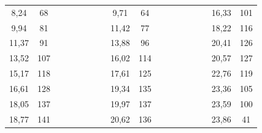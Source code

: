 \begin{enumerate}
\begin{table}[h!]
{\begin{tabular}{|cc|cccccccccccccccc}
					\multicolumn{1}{|c|}{8,24}     & 68                &  &  &  &  &  & \multicolumn{1}{c|}{} & \multicolumn{1}{c|}{9,71}     & \multicolumn{1}{c|}{64}                &  &  &  &  &  & \multicolumn{1}{c|}{} & \multicolumn{1}{c|}{16,33}    & \multicolumn{1}{c|}{101}               \\ \cline{1-2} \cline{9-10} \cline{17-18} 
					\multicolumn{1}{|c|}{9,94}     & 81                &  &  &  &  &  & \multicolumn{1}{c|}{} & \multicolumn{1}{c|}{11,42}    & \multicolumn{1}{c|}{77}                &  &  &  &  &  & \multicolumn{1}{c|}{} & \multicolumn{1}{c|}{18,22}    & \multicolumn{1}{c|}{116}               \\ \cline{1-2} \cline{9-10} \cline{17-18} 
					\multicolumn{1}{|c|}{11,37}    & 91                &  &  &  &  &  & \multicolumn{1}{c|}{} & \multicolumn{1}{c|}{13,88}    & \multicolumn{1}{c|}{96}                &  &  &  &  &  & \multicolumn{1}{c|}{} & \multicolumn{1}{c|}{20,41}    & \multicolumn{1}{c|}{126}               \\ \cline{1-2} \cline{9-10} \cline{17-18} 
					\multicolumn{1}{|c|}{13,52}    & 107               &  &  &  &  &  & \multicolumn{1}{c|}{} & \multicolumn{1}{c|}{16,02}    & \multicolumn{1}{c|}{114}               &  &  &  &  &  & \multicolumn{1}{c|}{} & \multicolumn{1}{c|}{20,57}    & \multicolumn{1}{c|}{127}               \\ \cline{1-2} \cline{9-10} \cline{17-18} 
					\multicolumn{1}{|c|}{15,17}    & 118               &  &  &  &  &  & \multicolumn{1}{c|}{} & \multicolumn{1}{c|}{17,61}    & \multicolumn{1}{c|}{125}               &  &  &  &  &  & \multicolumn{1}{c|}{} & \multicolumn{1}{c|}{22,76}    & \multicolumn{1}{c|}{119}               \\ \cline{1-2} \cline{9-10} \cline{17-18} 
					\multicolumn{1}{|c|}{16,61}    & 128               &  &  &  &  &  & \multicolumn{1}{c|}{} & \multicolumn{1}{c|}{19,34}    & \multicolumn{1}{c|}{135}               &  &  &  &  &  & \multicolumn{1}{c|}{} & \multicolumn{1}{c|}{23,36}    & \multicolumn{1}{c|}{105}               \\ \cline{1-2} \cline{9-10} \cline{17-18} 
					\multicolumn{1}{|c|}{18,05}    & 137               &  &  &  &  &  & \multicolumn{1}{c|}{} & \multicolumn{1}{c|}{19,97}    & \multicolumn{1}{c|}{137}               &  &  &  &  &  & \multicolumn{1}{c|}{} & \multicolumn{1}{c|}{23,59}    & \multicolumn{1}{c|}{100}               \\ \cline{1-2} \cline{9-10} \cline{17-18} 
					\multicolumn{1}{|c|}{18,77}    & 141               &  &  &  &  &  & \multicolumn{1}{c|}{} & \multicolumn{1}{c|}{20,62}    & \multicolumn{1}{c|}{136}               &  &  &  &  &  & \multicolumn{1}{c|}{} & \multicolumn{1}{c|}{23,86}    & \multicolumn{1}{c|}{41}                \\ \cline{1-2} \cline{9-10} \cline{17-18} 

\end{tabular}}
\end{table}
\end{enumerate}
